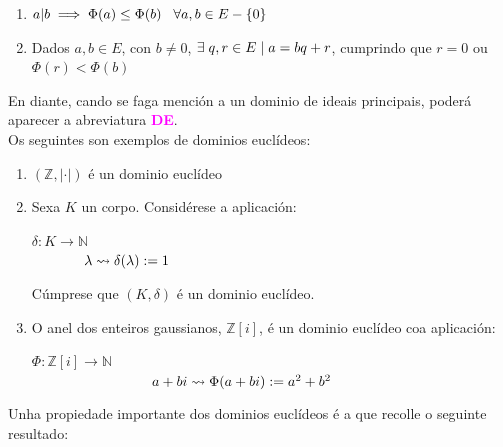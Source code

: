 \documentclass[twoside]{report}
\newcommand{\magbf}[1]{\textcolor{magenta}{\textbf{#1}}} %
\theoremstyle{mystyle}
\begin{document}
\begin{enumerate}
    \item $a | b \implies \Phi(a) \leq \Phi(b) \hspace{3mm} \forall a,b \in E -\{0\}$
    \item Dados $a,b \in E$, con $b \neq 0$, $\exists \hspace{1mm} q, r \in E \hspace{1mm} | \hspace{1mm} a = bq + r$, cumprindo que $r = 0$ ou $\Phi(r) < \Phi(b)$\\
\end{enumerate}

\noindent En diante, cando se faga mención a un dominio de ideais principais, poderá aparecer a abreviatura \magbf{DE}.\\

\noindent Os seguintes son exemplos de dominios euclídeos:

\begin{enumerate}
    \item $(\mathbb{Z}, |\cdot|)$ é un dominio euclídeo
    \item Sexa $K$ un corpo. Considérese a aplicación:
    
    \begin{center}
        $\delta: K \longrightarrow \mathbb{N}$ \\
        \vspace{2mm}
        $\hspace{13mm} \lambda \leadsto \delta(\lambda) := 1$
    \end{center} 
    
    Cúmprese que $(K, \delta)$ é un dominio euclídeo.
    
    \item O anel dos enteiros gaussianos, $\mathbb{Z}[i]$, é un dominio euclídeo coa aplicación:
    
        \begin{center}
        $\Phi: \mathbb{Z}[i] \longrightarrow \mathbb{N}$ \\
        \vspace{2mm}
        $\hspace{30mm} a + bi \leadsto \Phi(a + bi) := a^{2} + b^{2}$
    \end{center} 
    
\end{enumerate}

\noindent Unha propiedade importante dos dominios euclídeos é a que recolle o seguinte resultado:\\
\end{document}
